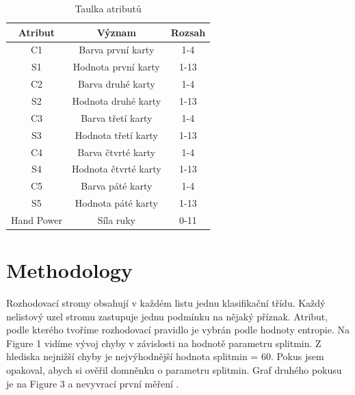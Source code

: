 \documentclass[journal]{IEEEtran}
\begin{document}
\begin{table}
\renewcommand{\arraystretch}{1.3}
\caption{Taulka atribut\r{u}}
\label{table_example}
\centering
\begin{tabular}{|c|c|c|}

\hline
Atribut & V\'{y}znam & Rozsah \\
\hline
\hline
C1 & Barva prvn\'{i} karty & 1-4\\
\hline
S1 & Hodnota prvn\'{i} karty & 1-13\\
\hline
C2 & Barva druh\'{e} karty & 1-4\\
\hline
S2 & Hodnota druh\'{e} karty & 1-13\\
\hline
C3 & Barva t\v{r}et\'{i} karty & 1-4\\
\hline
S3 & Hodnota t\v{r}et\'{i} karty & 1-13\\
\hline
C4 & Barva \v{c}tvrt\'{e} karty & 1-4\\
\hline
S4 & Hodnota \v{c}tvrt\'{e} karty & 1-13\\
\hline
C5 & Barva p\'{a}t\'{e} karty & 1-4\\
\hline
S5 & Hodnota p\'{a}t\'{e} karty & 1-13\\
\hline
Hand Power & S\'{i}la ruky & 0-11\\
\hline



\end{tabular}
\end{table}
\section{Methodology}
Rozhodovac\'{i} stromy obsahuj\'{i} v ka\v{z}d\'{e}m listu jednu klasifika\v{c}n\'{i} t\v{r}\'{i}du. Ka\v{z}d\'{y} nelistov\'{y} uzel stromu zastupuje jednu podm\'{i}nku na n\v{e}jak\'{y} p\v{r}\'{i}znak. Atribut, podle kter\'{e}ho tvo\v{r}\'{i}me rozhodovac\'{i} pravidlo je vybr\'{a}n podle hodnoty entropie. Na Figure 1 vid\'{i}me v\'{y}voj chyby v z\'{a}vislosti na hodnot\v{e} parametru splitmin. Z hlediska nejni\v{z}\v{s}\'{i} chyby je nejv\'{y}hodn\v{e}j\v{s}\'{i} hodnota splitmin = 60. Pokus jsem opakoval, abych si ov\v{e}\v{r}il domn\v{e}nku o parametru splitmin. Graf druh\'{e}ho pokusu je na Figure 3 a nevyvrac\'{i} prvn\'{i} m\v{e}\v{r}en\'{i} .
\end{document}
